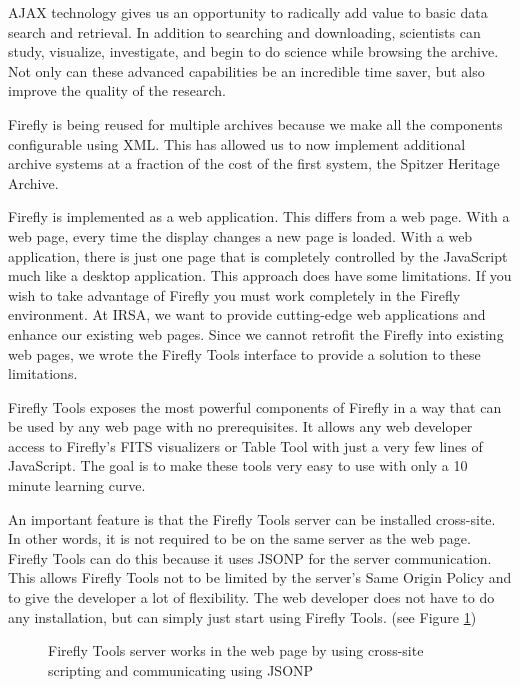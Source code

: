 AJAX technology gives us an opportunity to radically add value to basic data search and retrieval. In addition to searching and downloading, scientists can study, visualize, investigate, and begin to do science while browsing the archive. Not only can these advanced capabilities be an incredible time saver, but also improve the quality of the research.

Firefly is being reused for multiple archives because we make all the components configurable using XML. This has allowed us to now implement additional archive systems at a fraction of the cost of the first system, the Spitzer Heritage Archive.

Firefly is implemented as a web application. This differs from a web page. With a web page, every time the display changes a new page is loaded. With a web application, there is just one page that is completely controlled by the JavaScript much like a desktop application. This approach does have some limitations. If you wish to take advantage of Firefly you must work completely in the Firefly environment. At IRSA, we want to provide cutting-edge web applications and enhance our existing web pages. Since we cannot retrofit the Firefly into existing web pages, we wrote the Firefly Tools interface to provide a solution to these limitations.

Firefly Tools exposes the most powerful components of Firefly in a way that can be used by any web page with no prerequisites. It allows any web developer access to Firefly's FITS visualizers or Table Tool with just a very few lines of JavaScript. The goal is to make these tools very easy to use with only a 10 minute learning curve.  

An important feature is that the Firefly Tools server can be installed cross-site. In other words, it is not required to be on the same server as the web page. Firefly Tools can do this because it uses JSONP for the server communication.  This allows Firefly Tools not to be limited by the server's Same Origin Policy and to give the developer a lot of flexibility. The web developer does not have to do any installation, but can simply just start using Firefly Tools. (see Figure \ref{server-chart})

\begin{figure}[!ht]
\caption{\small Firefly Tools server works in the web page by using cross-site scripting and communicating using JSONP}
\label{server-chart}
\end{figure}


